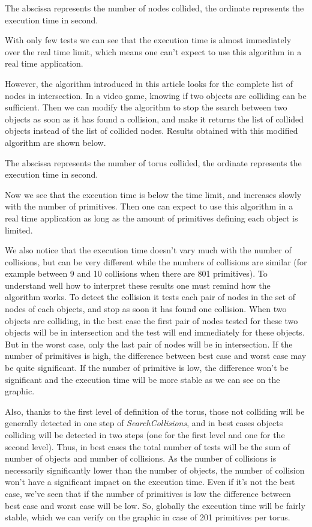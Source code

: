\documentclass[12pt, a4paper]{article}
\begin{document}
The abscissa represents the number of nodes collided, the ordinate represents the execution time in second. 

With only few tests we can see that the execution time is almost immediately over the real time limit, which means one can't expect to use this algorithm in a real time application. 

However, the algorithm introduced in this article looks for the complete list of nodes in intersection. In a video game, knowing if two objects are colliding can be sufficient. Then we can modify the algorithm to stop the search between two objects as soon as it has found a collision, and make it returns the list of collided objects instead of the list of collided nodes. Results obtained with this modified algorithm are shown below.\\


The abscissa represents the number of torus collided, the ordinate represents the execution time in second. 

Now we see that the execution time is below the time limit, and increases slowly with the number of primitives. Then one can expect to use this algorithm in a real time application as long as the amount of primitives defining each object is limited. 

We also notice that the execution time doesn't vary much with the number of collisions, but can be very different while the numbers of collisions are similar (for example between 9 and 10 collisions when there are 801 primitives). To understand well how to interpret these results one must remind how the algorithm works. To detect the collision it tests each pair of nodes in the set of nodes of each objects, and stop as soon it has found one collision. When two objects are colliding, in the best case the first pair of nodes tested for these two objects will be in intersection and the test will end immediately for these objects. But in the worst case, only the last pair of nodes will be in intersection. If the number of primitives is high, the difference between best case and worst case may be quite significant. If the number of primitive is low, the difference won't be significant and the execution time will be more stable as we can see on the graphic. 

Also, thanks to the first level of definition of the torus, those not colliding will be generally detected in one step of {\em SearchCollisions}, and in best cases objects colliding will be detected in two steps (one for the first level and one for the second level). Thus, in best cases the total number of tests will be the sum of number of objects and number of collisions. As the number of collisions is necessarily significantly lower than the number of objects, the number of collision won't have a significant impact on the execution time. Even if it's not the best case, we've seen that if the number of primitives is low the difference between best case and worst case will be low. So, globally the execution time will be fairly stable, which we can verify on the graphic in case of 201 primitives per torus.
\end{document}

